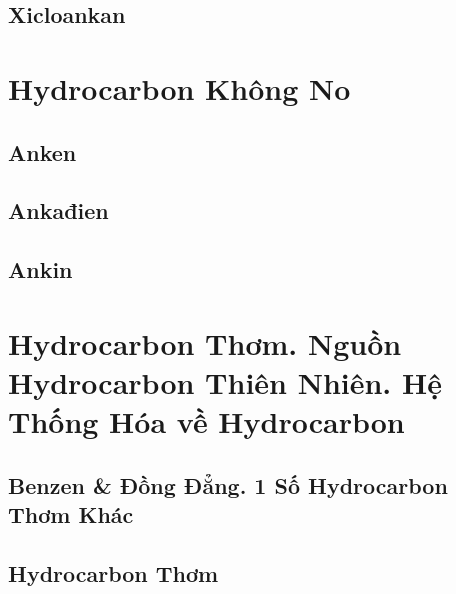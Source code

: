 \documentclass{article}
\numberwithin{equation}{section}
\begin{document}

\subsection{Xicloankan}


\section{Hydrocarbon Không No}

\subsection{Anken}


\subsection{Ankađien}


\subsection{Ankin}


\section{Hydrocarbon Thơm. Nguồn Hydrocarbon Thiên Nhiên. Hệ Thống Hóa về Hydrocarbon}

\subsection{Benzen \& Đồng Đẳng. 1 Số Hydrocarbon Thơm Khác}


\subsection{Hydrocarbon Thơm}
\end{document}
